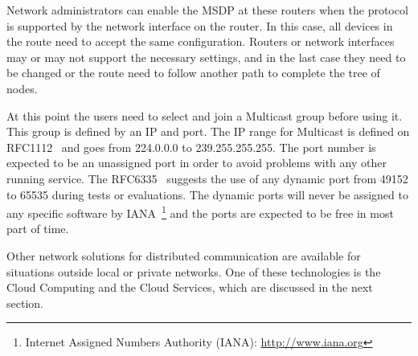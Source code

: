 Network administrators can enable the MSDP at these routers when the protocol is supported by the network interface on the router.
In this case, all devices in the route need to accept the same configuration.
Routers or network interfaces may or may not support the necessary settings, and in the last case they need to be changed or the route need to follow another path to complete the tree of nodes.    

At this point the users need to select and join a Multicast group before using it.
This group is defined by an IP and port.
The IP range for Multicast is defined on RFC1112~\citep{RFC1112Multicasting} and goes from 224.0.0.0 to 239.255.255.255.
The port number is expected to be an unassigned port in order to avoid problems with any other running service.
The RFC6335~\citep{RFC6335IANA} suggests the use of any dynamic port from 49152 to 65535 during tests or evaluations.
The dynamic ports will never be assigned to any specific software by IANA~\footnote{Internet Assigned Numbers Authority (IANA): \url{http://www.iana.org}} and the ports are expected to be free in most part of time.

Other network solutions for distributed communication are available for situations outside local or private networks.
One of these technologies is the Cloud Computing and the Cloud Services, which are discussed in the next section.
























